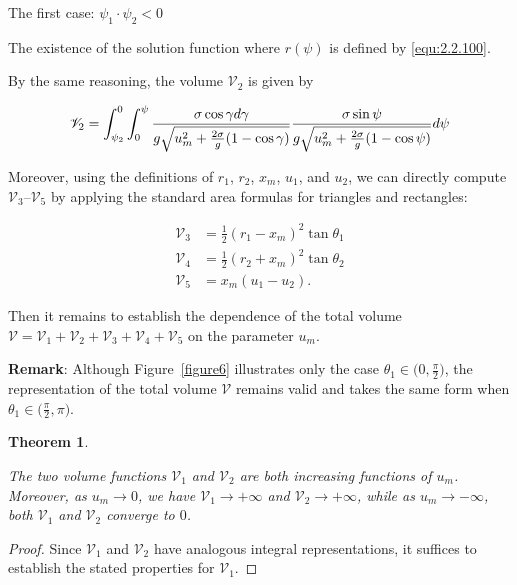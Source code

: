 \documentclass[letterpaper,reqno,10pt,twoside]{amsart}
\newtheorem{theorem}{Theorem}[section]
\theoremstyle{definition}
\theoremstyle{remark}
\begin{document}
\begin{section}{The first case: $\psi_1\cdot \psi_2<0$ }
\begin{subsection}{The existence of the solution function}
    \noindent where $r(\psi)$ is defined by \eqref{equ:2.2.100}.
    
    By the same reasoning, the volume $\mathscr{V}_{2}$ is given by
    
    \begin{equation}{\label{equ:2.2.30}}
        \mathscr{V}_{2}=\int_{\psi_2}^{0}  \int_{0}^{\psi}\frac{\sigma\cos\gamma d\gamma}{g\sqrt{u_m^{2}+\frac{2\sigma}{g}(1-\cos\gamma)}} \frac{\sigma\sin\psi}{g\sqrt{u_{m}^{2}+\frac{2\sigma}{g}(1-\cos\psi)}}d\psi
    \end{equation}

     Moreover, using the definitions of $r_{1}$, $r_{2}$, $x_{m}$, $u_{1}$, and $u_{2}$, we can directly compute $\mathscr{V}_{3}$–$\mathscr{V}_{5}$ by applying the standard area formulas for triangles and rectangles:

    \begin{align}
        \mathscr{V}_{3}&=\frac{1}{2}(r_1-x_m)^{2}\tan\theta_1 \label{equ:2.2.31}\\
        \mathscr{V}_{4}&=\frac{1}{2}(r_2+x_{m})^{2}\tan\theta_2 \label{equ:2.2.32}\\
        \mathscr{V}_{5}&=x_{m}(u_1-u_2)\label{equ:2.2.33}.
    \end{align}

    \noindent Then it remains to establish the dependence of the total volume $\mathscr{V}=\mathscr{V}_1+\mathscr{V}_2+\mathscr{V}_3+\mathscr{V}_4+\mathscr{V}_5$ on the parameter $u_{m}$.

    \textbf{Remark}: Although Figure~\ref{figure6} illustrates only the case $\theta_{1}\in\bigl(0,\tfrac{\pi}{2}\bigr)$, the representation of the total volume $\mathscr{V}$ remains valid and takes the same form when $\theta_{1}\in\bigl(\tfrac{\pi}{2},\pi\bigr)$.
    
    \begin{theorem}{\label{thm:v_1}}

    The two volume functions $\mathscr{V}_1$ and $\mathscr{V}_2$ are both increasing functions of $u_{m}$. Moreover, as $u_{m}\rightarrow 0$, we have $\mathscr{V}_1\to +\infty$ and $\mathscr{V}_2\rightarrow +\infty$, while as $u_m\rightarrow -\infty$, both $\mathscr{V}_1$ and $\mathscr{V}_{2}$ converge to $0$.
    
    \end{theorem}

    \begin{proof}

        Since $\mathscr{V}_1$ and $\mathscr{V}_2$ have analogous integral representations, it suffices to establish the stated properties for $\mathscr{V}_{1}$.


\end{proof}
\end{subsection}
\end{section}
\end{document}
